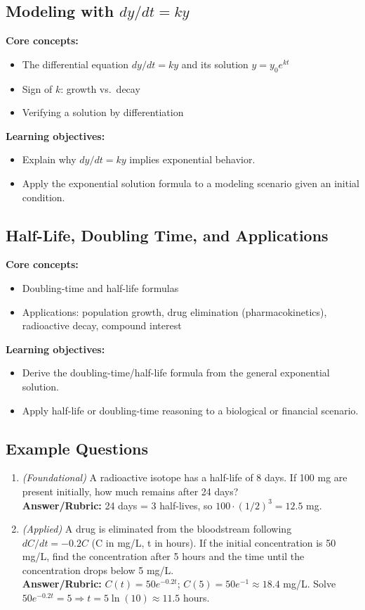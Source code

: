 \documentclass{article}
\begin{document}
\subsection{Modeling with $dy/dt = ky$}
\textbf{Core concepts:}
\begin{itemize}[leftmargin=*]
  \item The differential equation $dy/dt = ky$ and its solution $y=y_0e^{kt}$
  \item Sign of $k$: growth vs.\ decay
  \item Verifying a solution by differentiation
\end{itemize}
\textbf{Learning objectives:}
\begin{itemize}[leftmargin=*]
  \item Explain why $dy/dt = ky$ implies exponential behavior.
  \item Apply the exponential solution formula to a modeling scenario given an initial condition.
\end{itemize}

\subsection{Half-Life, Doubling Time, and Applications}
\textbf{Core concepts:}
\begin{itemize}[leftmargin=*]
  \item Doubling-time and half-life formulas
  \item Applications: population growth, drug elimination (pharmacokinetics), radioactive decay, compound interest
\end{itemize}
\textbf{Learning objectives:}
\begin{itemize}[leftmargin=*]
  \item Derive the doubling-time/half-life formula from the general exponential solution.
  \item Apply half-life or doubling-time reasoning to a biological or financial scenario.
\end{itemize}

\subsection*{Example Questions}
\begin{enumerate}[leftmargin=*]
  \item \textit{(Foundational)} A radioactive isotope has a half-life of 8 days. If 100 mg are present initially, how much remains after 24 days? \\
  \textbf{Answer/Rubric:} 24 days = 3 half-lives, so $100 \cdot (1/2)^3 = 12.5$ mg.
  \item \textit{(Applied)} A drug is eliminated from the bloodstream following $dC/dt = -0.2C$ (C in mg/L, t in hours). If the initial concentration is 50 mg/L, find the concentration after 5 hours and the time until the concentration drops below 5 mg/L. \\
  \textbf{Answer/Rubric:} $C(t)=50e^{-0.2t}$; $C(5)=50e^{-1}\approx 18.4$ mg/L. Solve $50e^{-0.2t}=5 \Rightarrow t = 5\ln(10) \approx 11.5$ hours.
\end{enumerate}
\end{document}
